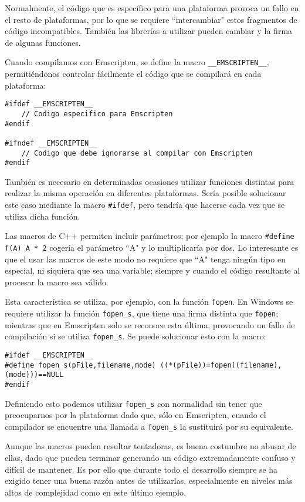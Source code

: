 Normalmente, el código que es específico para una plataforma provoca un fallo en el resto de plataformas, por lo que se requiere ``intercambiar" estos fragmentos de código incompatibles. También las librerías a utilizar pueden cambiar y la firma de algunas funciones.

Cuando compilamos con Emscripten, se define la macro \texttt{\_\_EMSCRIPTEN\_\_}, permitiéndonos controlar fácilmente el código que se compilará en cada plataforma:

\begin{lstlisting}
#ifdef __EMSCRIPTEN__
    // Codigo especifico para Emscripten
#endif

#ifndef __EMSCRIPTEN__
    // Codigo que debe ignorarse al compilar con Emscripten
#endif
\end{lstlisting}

También es necesario en determinadas ocasiones utilizar funciones distintas para realizar la misma operación en diferentes plataformas. Sería posible solucionar este caso mediante la macro \texttt{\#ifdef}, pero tendría que hacerse cada vez que se utiliza dicha función.

Las macros de C++ permiten incluir parámetros; por ejemplo la macro \texttt{\#define f(A) A * 2} cogería el parámetro ``A" y lo multiplicaría por dos. Lo interesante es que el usar las macros de este modo no requiere que ``A" tenga ningún tipo en especial, ni siquiera que sea una variable; siempre y cuando el código resultante al procesar la macro sea válido.

Esta característica se utiliza, por ejemplo, con la función \texttt{fopen}. En Windows se requiere utilizar la función \texttt{fopen\_s}, que tiene una firma distinta que \texttt{fopen}; mientras que en Emscripten solo se reconoce esta última, provocando un fallo de compilación si se utiliza \texttt{fopen\_s}. Se puede solucionar esto con la macro:

\begin{lstlisting}
#ifdef __EMSCRIPTEN__
#define fopen_s(pFile,filename,mode) ((*(pFile))=fopen((filename),(mode)))==NULL
#endif
\end{lstlisting}

Definiendo esto podemos utilizar \texttt{fopen\_s} con normalidad sin tener que preocuparnos por la plataforma dado que, sólo en Emscripten, cuando el compilador se encuentre una llamada a \texttt{fopen\_s} la sustituirá por su equivalente.

Aunque las macros pueden resultar tentadoras, es buena costumbre no abusar de ellas, dado que pueden terminar generando un código extremadamente confuso y difícil de mantener. Es por ello que durante todo el desarrollo siempre se ha exigido tener una buena razón antes de utilizarlas, especialmente en niveles más altos de complejidad como en este último ejemplo.

